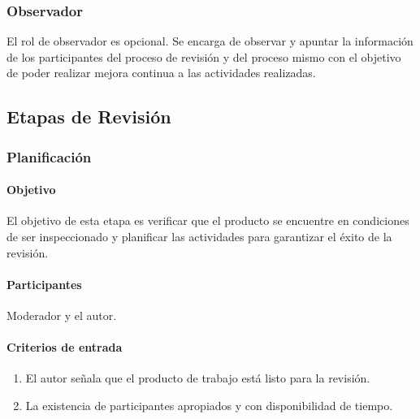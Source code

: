 \subsubsection{Observador}

El rol de observador es opcional. Se encarga de observar y apuntar la información de los participantes del proceso de revisión y del proceso mismo con el objetivo de poder realizar mejora continua a las actividades realizadas. 

\subsection{Etapas de Revisión}

\subsubsection{Planificación}

\paragraph{Objetivo\\}

El objetivo de esta etapa es verificar que el producto se encuentre en condiciones de ser inspeccionado y planificar las actividades para garantizar el éxito de la revisión.

\paragraph{Participantes\\}

Moderador y el autor.

\paragraph{Criterios de entrada}

\begin{enumerate}
	\item 
		El autor señala que el producto de trabajo está listo para la revisión.
	\item
		La existencia de participantes apropiados y con disponibilidad de tiempo.
\end{enumerate}

